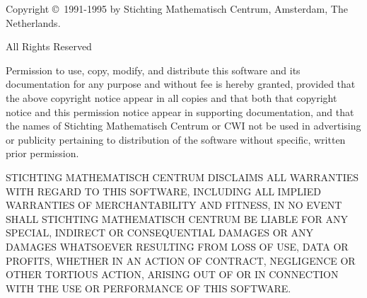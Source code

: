 Copyright \copyright\ 1991-1995 by Stichting Mathematisch Centrum,
Amsterdam, The Netherlands.

\begin{center}
All Rights Reserved
\end{center}

Permission to use, copy, modify, and distribute this software and its
documentation for any purpose and without fee is hereby granted,
provided that the above copyright notice appear in all copies and that
both that copyright notice and this permission notice appear in
supporting documentation, and that the names of Stichting Mathematisch
Centrum or CWI not be used in advertising or publicity pertaining to
distribution of the software without specific, written prior permission.

STICHTING MATHEMATISCH CENTRUM DISCLAIMS ALL WARRANTIES WITH REGARD TO
THIS SOFTWARE, INCLUDING ALL IMPLIED WARRANTIES OF MERCHANTABILITY AND
FITNESS, IN NO EVENT SHALL STICHTING MATHEMATISCH CENTRUM BE LIABLE
FOR ANY SPECIAL, INDIRECT OR CONSEQUENTIAL DAMAGES OR ANY DAMAGES
WHATSOEVER RESULTING FROM LOSS OF USE, DATA OR PROFITS, WHETHER IN AN
ACTION OF CONTRACT, NEGLIGENCE OR OTHER TORTIOUS ACTION, ARISING OUT
OF OR IN CONNECTION WITH THE USE OR PERFORMANCE OF THIS SOFTWARE.

